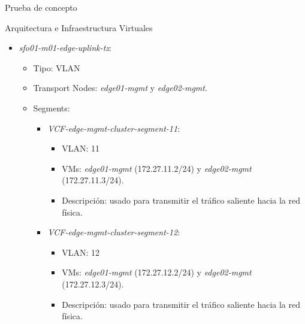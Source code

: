 \begin{section}{Prueba de concepto}
\begin{subsection}{Arquitectura e Infraestructura Virtuales\cite{CFVirtInfraes}}
\begin{itemize}
\begin{itemize}
\begin{itemize}
\begin{itemize}
            \end{itemize}
        \end{itemize}
    \end{itemize}
  \item \textit{sfo01-m01-edge-uplink-tz}:
    \begin{itemize}
      \item Tipo: VLAN
      \item Transport Nodes: \textit{edge01-mgmt} y \textit{edge02-mgmt}.
      \item Segments:
        \begin{itemize}
          
          \item \textit{VCF-edge-mgmt-cluster-segment-11}:
            \begin{itemize}
              \item VLAN: 11
              \item VMs: \textit{edge01-mgmt} (172.27.11.2/24) y \textit{edge02-mgmt} (172.27.11.3/24).
              \item Descripción: usado para transmitir el tráfico saliente hacia la red física.
            \end{itemize}
          \item \textit{VCF-edge-mgmt-cluster-segment-12}:
            \begin{itemize}
              \item VLAN: 12
              \item VMs: \textit{edge01-mgmt} (172.27.12.2/24) y \textit{edge02-mgmt} (172.27.12.3/24).
              \item Descripción: usado para transmitir el tráfico saliente hacia la red física.
            \end{itemize}
        \end{itemize}
      \end{itemize}
\end{itemize}


\end{subsection}
\end{section}
